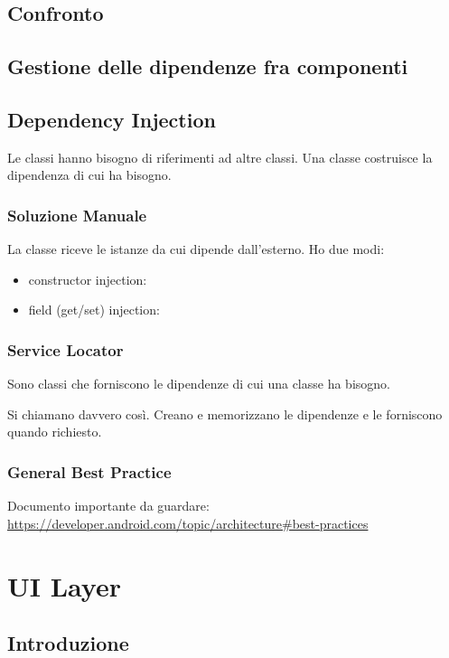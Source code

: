 \subsection{Confronto}
\subsection{Gestione delle dipendenze fra componenti}
\subsection{Dependency Injection}
\par Le classi hanno bisogno di riferimenti ad altre classi. Una classe costruisce la dipendenza di cui ha bisogno.

\subsubsection{Soluzione Manuale}
\par La classe riceve le istanze da cui dipende dall'esterno. Ho due modi:
\begin{itemize}
    \item constructor injection: %
    \item field (get/set) injection: %
\end{itemize}

\subsubsection{Service Locator}
\par Sono classi che forniscono le dipendenze di cui una classe ha bisogno. %
\par Si chiamano davvero così. Creano e memorizzano le dipendenze e le forniscono quando richiesto.

\subsubsection{General Best Practice}
\par Documento importante da guardare: \url{https://developer.android.com/topic/architecture#best-practices}

\section{UI Layer}
\subsection{Introduzione}
